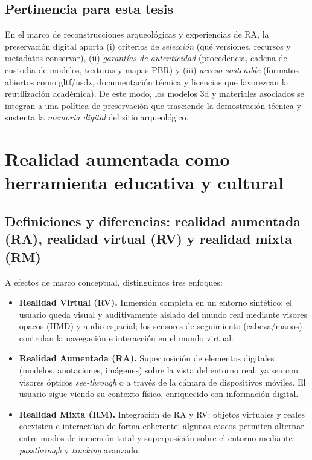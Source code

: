 \subsection*{Pertinencia para esta tesis}
En el marco de reconstrucciones arqueológicas y experiencias de RA, la preservación digital aporta (i) criterios de \emph{selección} (qué versiones, recursos y metadatos conservar), (ii) \emph{garantías de autenticidad} (procedencia, cadena de custodia de modelos, texturas y mapas \gls{PBR}) y (iii) \emph{acceso sostenible} (formatos abiertos como \gls{gltf}/\gls{usdz}, documentación técnica y licencias que favorezcan la reutilización académica). De este modo, los modelos \gls{3d} y materiales asociados se integran a una política de preservación que trasciende la demostración técnica y sustenta la \emph{memoria digital} del sitio arqueológico.

\section*{Realidad aumentada como herramienta educativa y cultural}

\subsection*{Definiciones y diferencias: realidad aumentada (RA), realidad virtual (RV) y realidad mixta (RM)}

A efectos de marco conceptual, distinguimos tres enfoques:\cite{Xataka2018ARVRMR}
\begin{itemize}
  \item \textbf{Realidad Virtual (RV).} Inmersión completa en un entorno sintético: el usuario queda visual y auditivamente aislado del mundo real mediante visores opacos (HMD) y audio espacial; los sensores de seguimiento (cabeza/manos) controlan la navegación e interacción en el mundo virtual.
  \item \textbf{Realidad Aumentada (RA).} Superposición de elementos digitales (modelos, anotaciones, imágenes) sobre la vista del entorno real, ya sea con visores ópticos \emph{see-through} o a través de la cámara de dispositivos móviles. El usuario sigue viendo su contexto físico, enriquecido con información digital.
  \item \textbf{Realidad Mixta (RM).} Integración de RA y RV: objetos virtuales y reales coexisten e interactúan de forma coherente; algunos cascos permiten alternar entre modos de inmersión total y superposición sobre el entorno mediante \emph{passthrough} y \emph{tracking} avanzado.
\end{itemize}


